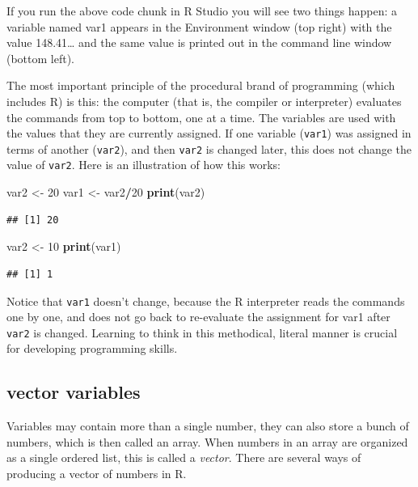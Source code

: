 \documentclass[
]{book}
\newenvironment{Shaded}{\begin{snugshade}}{\end{snugshade}}
\newcommand{\DecValTok}[1]{\textcolor[rgb]{0.00,0.00,0.81}{#1}}
\newcommand{\KeywordTok}[1]{\textcolor[rgb]{0.13,0.29,0.53}{\textbf{#1}}}
\newcommand{\NormalTok}[1]{#1}
\newcommand{\OperatorTok}[1]{\textcolor[rgb]{0.81,0.36,0.00}{\textbf{#1}}}
\newcommand{\StringTok}[1]{\textcolor[rgb]{0.31,0.60,0.02}{#1}}
\begin{document}
If you run the above code chunk in R Studio you will see two things happen: a variable named var1 appears in the Environment window (top right) with the value 148.41\ldots{} and the same value is printed out in the command line window (bottom left).

The most important principle of the procedural brand of programming (which includes R) is this: the computer (that is, the compiler or interpreter) evaluates the commands from top to bottom, one at a time. The variables are used with the values that they are currently assigned. If one variable (\texttt{var1}) was assigned in terms of another (\texttt{var2}), and then \texttt{var2} is changed later, this does not change the value of \texttt{var2}. Here is an illustration of how this works:

\begin{Shaded}
\begin{Highlighting}[]
\NormalTok{var2 \textless{}{-}}\StringTok{ }\DecValTok{20}
\NormalTok{var1 \textless{}{-}}\StringTok{ }\NormalTok{var2}\OperatorTok{/}\DecValTok{20}
\KeywordTok{print}\NormalTok{(var2)}
\end{Highlighting}
\end{Shaded}

\begin{verbatim}
## [1] 20
\end{verbatim}

\begin{Shaded}
\begin{Highlighting}[]
\NormalTok{var2 \textless{}{-}}\StringTok{ }\DecValTok{10}
\KeywordTok{print}\NormalTok{(var1)}
\end{Highlighting}
\end{Shaded}

\begin{verbatim}
## [1] 1
\end{verbatim}

Notice that \texttt{var1} doesn't change, because the R interpreter reads the commands one by one, and does not go back to re-evaluate the assignment for var1 after \texttt{var2} is changed. Learning to think in this methodical, literal manner is crucial for developing programming skills.

\hypertarget{vector-variables}{%
\subsection{vector variables}\label{vector-variables}}

Variables may contain more than a single number, they can also store a bunch of numbers, which is then called an array. When numbers in an array are organized as a single ordered list, this is called a  \emph{vector}. There are several ways of producing a vector of numbers in R.
\end{document}
